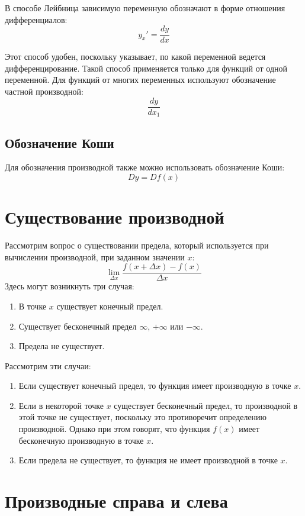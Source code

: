 \documentclass[a4paper,12pt,oneside]{extbook}
\theoremstyle{numbered}
\theoremstyle{unnumbered}
\theoremstyle{named}
\theoremstyle{unnumbered}
\theoremstyle{named}
\theoremstyle{named}
\theoremstyle{named}
\begin{document}
В способе Лейбница зависимую переменную обозначают в форме отношения дифференциалов:
\[
    y_{x}' = \frac{dy}{dx}
\]

Этот способ удобен, поскольку указывает, по какой переменной ведется дифференцирование. Такой способ применяется только для функций от одной переменной. Для функций от многих переменных используют обозначение частной производной:
\[
    \frac{dy}{dx_1}
\]

\subsection{Обозначение Коши}%
\label{sub:Обозначение Коши}

Для обозначения производной также можно использовать обозначение Коши:
\[
    Dy = Df(x)
\]

\section{Существование производной}%
\label{sec:Существование производной}

Рассмотрим вопрос о существовании предела, который используется при вычислении производной, при заданном значении \(x\):
\[
    \lim_{\Delta{x}}{\frac{f(x + \Delta{x}) - f(x)}{\Delta{x}}}
\]
Здесь могут возникнуть три случая:
\begin{enumerate}
    \item {В точке \(x\) существует конечный предел.}
    \item {Существует бесконечный предел \(\infty\), \(+\infty\) или \(-\infty\).}
    \item {Предела не существует.}
\end{enumerate}

Рассмотрим эти случаи:
\begin{enumerate}
    \item {Если существует конечный предел, то функция имеет производную в точке \(x\).}
    \item {Если в некоторой точке \(x\) существует бесконечный предел, то производной в этой точке не существует, поскольку это противоречит определению производной. Однако при этом говорят, что функция \(f(x)\) имеет бесконечную производную в точке \(x\).}
    \item {Если предела не существует, то функция не имеет производной в точке \(x\).}
\end{enumerate}

\section{Производные справа и слева}%
\label{sec:Производные справа и слева}
\end{document}
